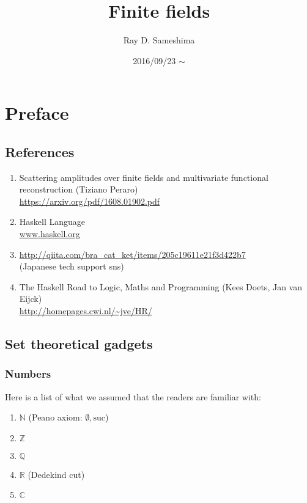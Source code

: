 \documentclass[11pt]{book}
\begin{document}
\newcommand{\Slash}[1]{{\ooalign{\hfil/\crcr$#1$}}}

\title{Finite fields}
\author{Ray D. Sameshima}
\date{2016/09/23 $\sim$ }
\maketitle

\tableofcontents

\setcounter{chapter}{-1}
\chapter{Preface}
\section{References}
\begin{enumerate}
\item Scattering amplitudes over finite fields and multivariate functional reconstruction (Tiziano Peraro)\\
\url{https://arxiv.org/pdf/1608.01902.pdf}

\item Haskell Language \\
\url{www.haskell.org}

\item \url{http://qiita.com/bra_cat_ket/items/205c19611e21f3d422b7}\\
(Japanese tech support sns)

\item \label{Haskellroad}
The Haskell Road to Logic, Maths and Programming (Kees Doets, Jan van Eijck)\\
\url{http://homepages.cwi.nl/~jve/HR/}
\end{enumerate}

\section{Set theoretical gadgets}
\subsection{Numbers}
Here is a list of what we assumed that the readers are familiar with:
\begin{enumerate}
\item $\mathbb{N}$ (Peano axiom: $\emptyset, \text{suc}$)
\item $\mathbb{Z}$
\item $\mathbb{Q}$
\item $\mathbb{R}$ (Dedekind cut)
\item $\mathbb{C}$ 
\end{enumerate}
\end{document}
